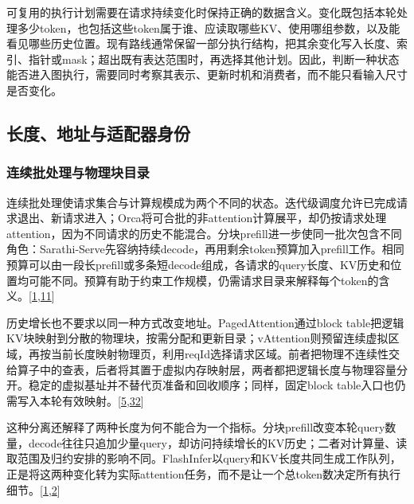 \documentclass[
  UTF8,
  zihao=5]{ctexart}
\begin{document}
可复用的执行计划需要在请求持续变化时保持正确的数据含义。变化既包括本轮处理多少token，也包括这些token属于谁、应读取哪些KV、使用哪组参数，以及能看见哪些历史位置。现有路线通常保留一部分执行结构，把其余变化写入长度、索引、指针或mask；超出既有表达范围时，再选择其他计划。因此，判断一种状态能否进入图执行，需要同时考察其表示、更新时机和消费者，而不能只看输入尺寸是否变化。

\hypertarget{ux957fux5ea6ux5730ux5740ux4e0eux9002ux914dux5668ux8eabux4efd}{%
\subsection{长度、地址与适配器身份}\label{ux957fux5ea6ux5730ux5740ux4e0eux9002ux914dux5668ux8eabux4efd}}

\hypertarget{ux8fdeux7eedux6279ux5904ux7406ux4e0eux7269ux7406ux5757ux76eeux5f55}{%
\subsubsection{连续批处理与物理块目录}\label{ux8fdeux7eedux6279ux5904ux7406ux4e0eux7269ux7406ux5757ux76eeux5f55}}

连续批处理使请求集合与计算规模成为两个不同的状态。迭代级调度允许已完成请求退出、新请求进入；Orca将可合批的非attention计算展平，却仍按请求处理attention，因为不同请求的历史不能混合。分块prefill进一步使同一批次包含不同角色：Sarathi-Serve先容纳持续decode，再用剩余token预算加入prefill工作。相同预算可以由一段长prefill或多条短decode组成，各请求的query长度、KV历史和位置均可能不同。预算有助于约束工作规模，仍需请求目录来解释每个token的含义。{[}\protect\hyperlink{ref-agrawal2024sarathi}{1},\protect\hyperlink{ref-yu2022orca}{11}{]}

历史增长也不要求以同一种方式改变地址。PagedAttention通过block
table把逻辑KV块映射到分散的物理块，按需分配和更新目录；vAttention则预留连续虚拟区域，再按当前长度映射物理页，利用reqId选择请求区域。前者把物理不连续性交给算子中的查表，后者将其置于虚拟内存映射层，两者都把逻辑长度与物理容量分开。稳定的虚拟基址并不替代页准备和回收顺序；同样，固定block
table入口也仍需写入本轮有效映射。{[}\protect\hyperlink{ref-kwon2023vllm}{5},\protect\hyperlink{ref-prabhu2025vattention}{32}{]}

这种分离还解释了两种长度为何不能合为一个指标。分块prefill改变本轮query数量，decode往往只追加少量query，却访问持续增长的KV历史；二者对计算量、读取范围及归约安排的影响不同。FlashInfer以query和KV长度共同生成工作队列，正是将这两种变化转为实际attention任务，而不是让一个总token数决定所有执行细节。{[}\protect\hyperlink{ref-agrawal2024sarathi}{1},\protect\hyperlink{ref-ye2025flashinfer}{2}{]}
\end{document}
